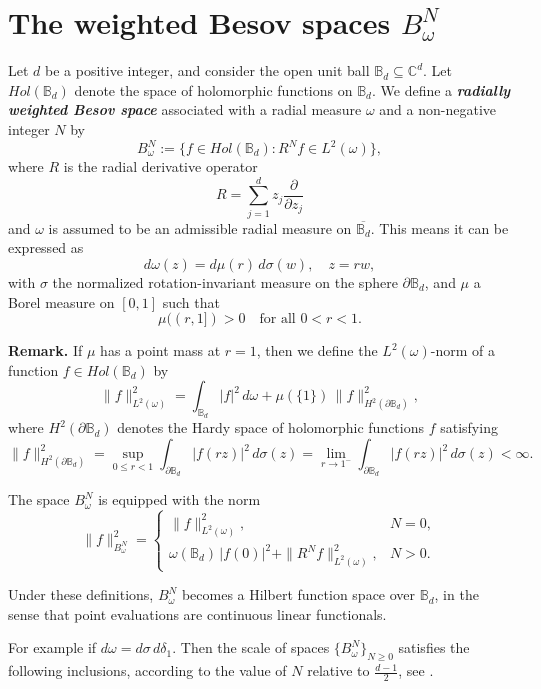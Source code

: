 \documentclass{article}
\numberwithin{equation}{section}
\newcommand{\Bd}{\mathbb B_d}
\begin{document}
\section{The weighted Besov spaces \texorpdfstring{$B^N_\omega$}{BN omega}}
Let $d $ be a positive integer, and consider the open unit ball $\mathbb{B}_d \subseteq  \mathbb{C}^d$. Let $Hol(\mathbb{B}_d)$ denote  the space of holomorphic functions on $\mathbb{B}_d$. We define a \textbf{\emph{radially weighted Besov space}} associated with a radial measure $\omega$ and a non-negative integer $N$ by
\[
B^N_\omega := \bigl\{ f \in Hol(\mathbb{B}_d) : R^N f \in L^2(\omega) \bigr\},
\]
where $R$ is the radial derivative operator
\[
R = \sum_{j=1}^{d} z_j \frac{\partial}{\partial z_j}
\]
and  $\omega$ is assumed to be an admissible  radial measure on $\overline{\Bd}$. This means  it can be expressed as
\[
d\omega(z) = d\mu(r) \, d\sigma(w), \quad z = r w,
\]
with $\sigma$ the normalized rotation-invariant measure on the sphere $\partial \mathbb{B}_d$, and $\mu$ a Borel measure on $[0,1]$ such that
\[
\mu((r,1]) > 0 \quad \text{for all } 0<r<1.
\]

\medskip

\noindent
\textbf{Remark.} If $\mu$ has a point mass at $r=1$, then we define the $L^2(\omega)$-norm of a function $f \in Hol(\mathbb{B}_d)$ by
\[
\|f\|^2_{L^2(\omega)} = \int_{\mathbb{B}_d} |f|^2 \, d\omega + \mu(\{1\}) \, \|f\|^2_{H^2(\partial \mathbb{B}_d)},
\]
where $H^2(\partial \mathbb{B}_d)$ denotes the Hardy space of holomorphic functions $f$ satisfying
\[
\|f\|^2_{H^2(\partial \mathbb{B}_d)} = \sup_{0 \le r < 1} \int_{\partial \mathbb{B}_d} |f(r z)|^2 \, d\sigma(z) = \lim_{r \to 1^-} \int_{\partial \mathbb{B}_d} |f(r z)|^2 \, d\sigma(z) < \infty.
\]

\medskip

\noindent
The space $B^N_\omega$ is equipped with the norm
\[
\|f\|^2_{B^N_\omega} =
\begin{cases}
\|f\|^2_{L^2(\omega)}, & N=0,\\[0.5em]
\omega(\mathbb{B}_d) \, |f(0)|^2 + \|R^N f\|^2_{L^2(\omega)}, & N>0.
\end{cases}
\]

\medskip

\noindent
Under these definitions, $B^N_\omega$ becomes a Hilbert function space over $\mathbb{B}_d$, in the sense that point evaluations are continuous linear functionals.


\medskip

For example if $d\omega = d\sigma \, d\delta_{1}$. Then the scale of spaces
$\{B^{N}_{\omega}\}_{N \ge 0}$ satisfies the following inclusions,
according to the value of $N$ relative to $\frac{d-1}{2}$, see \cite{Richteriteratedlog}.
\end{document}
